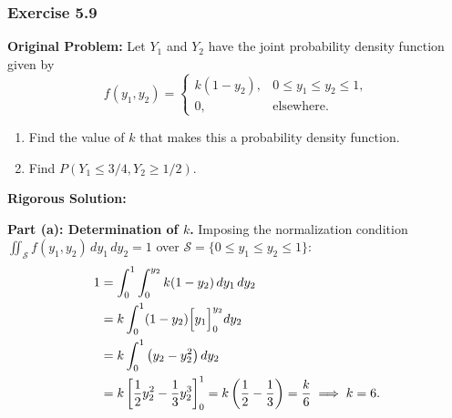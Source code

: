 \documentclass[11pt, letterpaper]{article}
\theoremstyle{definition}
\theoremstyle{remark}
\begin{document}
\bigskip

\subsubsection*{Exercise 5.9}
\textbf{Original Problem:} Let $Y_1$ and $Y_2$ have the joint probability density function given by
\[
    f(y_1, y_2) = \begin{cases}
        k(1 - y_2), & 0 \le y_1 \le y_2 \le 1, \\
        0, & \text{elsewhere.}
    \end{cases}
\]
\begin{enumerate}[label=\textbf{\alph*}]
    \item Find the value of $k$ that makes this a probability density function.
    \item Find $P(Y_1 \le 3/4, Y_2 \ge 1/2)$.
\end{enumerate}

\textbf{Rigorous Solution:}

\textbf{Part (a): Determination of $k$.}
Imposing the normalization condition $\iint_{\mathcal{S}} f(y_1, y_2) \, dy_1 \, dy_2 = 1$ over $\mathcal{S} = \{0 \le y_1 \le y_2 \le 1\}$:
\begin{align*}
    1 &= \int_{0}^{1} \int_{0}^{y_2} k(1 - y_2) \, dy_1 \, dy_2 \\
    &= k \int_{0}^{1} (1 - y_2) \Bigl[ y_1 \Bigr]_{0}^{y_2} dy_2 \\
    &= k \int_{0}^{1} \left( y_2 - y_2^2 \right) dy_2 \\
    &= k \left[ \frac{1}{2} y_2^2 - \frac{1}{3} y_2^3 \right]_{0}^{1} = k \left( \frac{1}{2} - \frac{1}{3} \right) = \frac{k}{6} \implies k = 6.
\end{align*}
\end{document}
